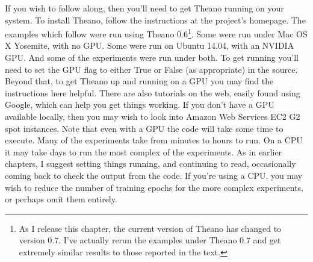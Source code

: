\documentclass[a4paper,twoside,10pt]{book}
\begin{document}
If you wish to follow along, then you'll need to get Theano running on your system. To install Theano, follow the instructions at the project's homepage. The examples which follow were run using Theano 0.6\footnote{As I release this chapter, the current version of Theano has changed to version 0.7. I've actually rerun the examples under Theano 0.7 and get extremely similar results to those reported in the text.}. Some were run under Mac OS X Yosemite, with no GPU. Some were run on Ubuntu 14.04, with an NVIDIA GPU. And some of the experiments were run under both. To get  running you'll need to set the GPU flag to either True or False (as appropriate) in the  source. Beyond that, to get Theano up and running on a GPU you may find the instructions here helpful. There are also tutorials on the web, easily found using Google, which can help you get things working. If you don't have a GPU available locally, then you may wish to look into Amazon Web Services EC2 G2 spot instances. Note that even with a GPU the code will take some time to execute. Many of the experiments take from minutes to hours to run. On a CPU it may take days to run the most complex of the experiments. As in earlier chapters, I suggest setting things running, and continuing to read, occasionally coming back to check the output from the code. If you're using a CPU, you may wish to reduce the number of training epochs for the more complex experiments, or perhaps omit them entirely.
\end{document}
